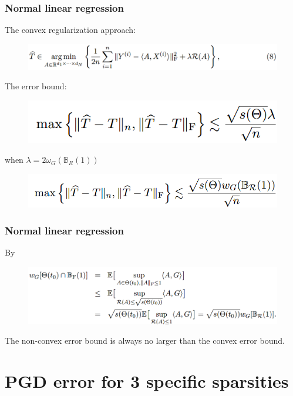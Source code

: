 \documentclass{beamer}
\begin{document}
	\begin{frame}
		\frametitle{Normal linear regression}
		The convex regularization approach:
		\begin{figure}
			\includegraphics[width=.8\linewidth]{image024.png}
		\end{figure}
		The error bound:
		\begin{figure}
			\includegraphics[width=.5\linewidth]{image025.png}
		\end{figure}
		when $\lambda=2\omega_G(\mathbb{B}_R(1))$
		\begin{figure}
			\includegraphics[width=.6\linewidth]{image026.png}
		\end{figure}
	\end{frame}
	
	\begin{frame}
		\frametitle{Normal linear regression}
		By
		\begin{figure}
			\includegraphics[width=.9\linewidth]{image027.png}
		\end{figure}
		The non-convex error bound is always no larger than the convex error bound.
	\end{frame}
	
	\section{PGD error for 3 specific sparsities}
	
\end{document}
